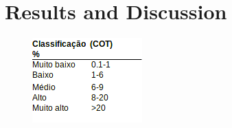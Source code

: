 \documentclass[aspectratio=169]{beamer} %
\begin{document}
{{{{{{{\begin{frame}
\end{frame}
}
}




\section{Results and Discussion}


{

{ \begin{frame}
	\vspace{1cm}
	\begin{center}
	\begin{large}
	\color{blue}{Victoria Lake}
	\end{large}
	\end{center}
	    \begin{figure}
		\centering
		\includegraphics[scale=0.45]{images/COT_variables.png}
	\end{figure}
	\pause
\begin{flushright}
    \begin{columns}


\end{columns}
\end{flushright}
\end{frame}}}}}}}}
\end{document}
